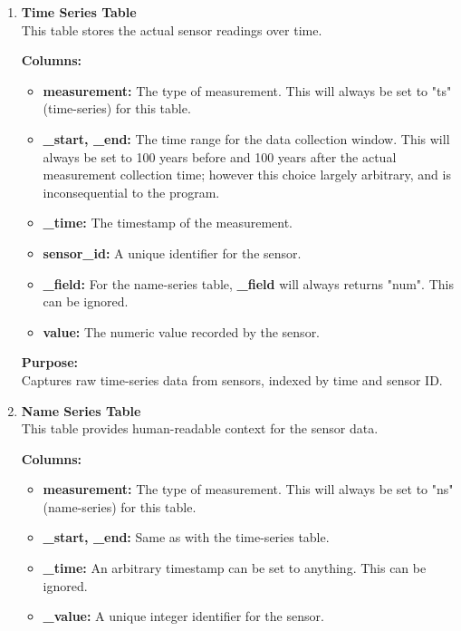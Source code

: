 \documentclass{article}
\begin{document}
\begin{enumerate}
    \item \textbf{Time Series Table}
    \\ 
    This table stores the actual sensor readings over time.
    
    \vspace{10pt}
    \textbf{Columns:}
    \begin{itemize}
        \item \textbf{measurement:} The type of measurement. This will always be set to "ts" (time-series) for this table.
        \item \textbf{\_start, \_end:} The time range for the data collection window. This will always be set to 100 years before and 100 years after the actual measurement collection time; however this choice largely arbitrary, and is inconsequential to the program.
        \item \textbf{\_time:} The timestamp of the measurement.
        \item \textbf{sensor\_id:} A unique identifier for the sensor.
        \item \textbf{\_field:} For the name-series table, \textbf{\_field} will always returns "num". This can be ignored.
        \item \textbf{value:} The numeric value recorded by the sensor.
    \end{itemize}
    \textbf{Purpose:}
    \\
    \noindent 
    Captures raw time-series data from sensors, indexed by time and sensor ID.

    \item \textbf{Name Series Table}
    \\ 
    This table provides human-readable context for the sensor data.
    
    \vspace{10pt}
    \textbf{Columns:}
    \begin{itemize}
        \item \textbf{measurement:}  The type of measurement. This will always be set to "ns" (name-series) for this table.
        
        \item \textbf{\_start, \_end:} Same as with the time-series table.
        
        \item \textbf{\_time:} An arbitrary timestamp can be set to anything. This can be ignored.
        
        \item \textbf{\_value:} A unique integer identifier for the sensor.
        

\end{itemize}
\end{enumerate}
\end{document}
